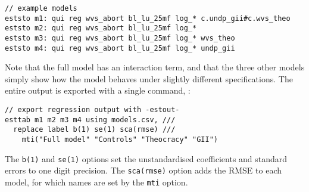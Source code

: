 \begin{verbatim}
// example models
eststo m1: qui reg wvs_abort bl_lu_25mf log_* c.undp_gii#c.wvs_theo
eststo m2: qui reg wvs_abort bl_lu_25mf log_*
eststo m3: qui reg wvs_abort bl_lu_25mf log_* wvs_theo
eststo m4: qui reg wvs_abort bl_lu_25mf log_* undp_gii
\end{verbatim}

Note that the full model has an interaction term, and that the three other models simply show how the model behaves under slightly different specifications. The entire output is exported with a single command, :

\begin{verbatim}
// export regression output with -estout-
esttab m1 m2 m3 m4 using models.csv, ///
  replace label b(1) se(1) sca(rmse) ///
	mti("Full model" "Controls" "Theocracy" "GII")
\end{verbatim}

The \texttt{b(1)} and \texttt{se(1)} options set the unstandardised coefficients and standard errors to one digit precision. The \texttt{sca(rmse)} option adds the RMSE to each model, for which names are set by the \texttt{mti} option.
